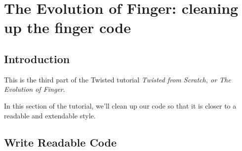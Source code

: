 \section{The Evolution of Finger: cleaning up the finger code\label{doc/howto/tutorial/style.xhtml}}


\subsection{Introduction}


 This is the third part of the Twisted tutorial \textit{Twisted from Scratch, or The Evolution of Finger}.

In this section of the tutorial, we'll clean up our code so that it is closer to a readable and extendable style.

\subsection{Write Readable Code}


